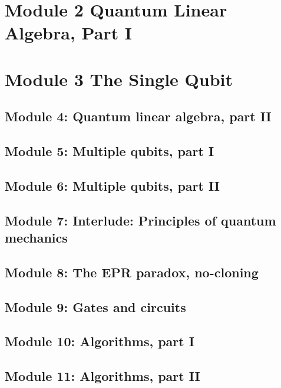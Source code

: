 \section{Module 2 Quantum Linear Algebra, Part I}


\section{Module 3 The Single Qubit}


\subsection{Module 4: Quantum linear algebra, part II}


\subsection{Module 5: Multiple qubits, part I}


\subsection{Module 6: Multiple qubits, part II}


\subsection{Module 7: Interlude: Principles of quantum mechanics}


\subsection{Module 8: The EPR paradox, no-cloning}


\subsection{Module 9: Gates and circuits}


\subsection{Module 10: Algorithms, part I}


\subsection{Module 11: Algorithms, part II}


